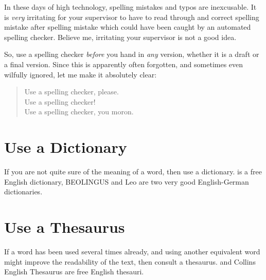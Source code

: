 In these days of high technology, spelling mistakes and typos are
inexcusable. It is \emph{very} irritating for your supervisor to have
to read through and correct spelling mistake after spelling mistake
which could have been caught by an automated spelling checker.
Believe me, irritating your supervisor is not a good idea.

So, use a spelling checker \emph{before} you hand in \emph{any}
version, whether it is a draft or a final version.
Since this is apparently often forgotten, and sometimes even wilfully
ignored, let me make it absolutely clear:
\begin{quote}
\begin{em}
Use a spelling checker, please. \\
Use a spelling checker! \\
Use a spelling checker, you moron. \\
\end{em}
\end{quote}





\section{Use a Dictionary}
\label{sec:dictionary}

If you are not quite sure of the meaning of a word, then use a
dictionary.  \parencite{DictionaryCom} is a
free English dictionary, BEOLINGUS \parencite{DictChemnitz} and Leo
\parencite{DictLeoOrg} are two very good English-German dictionaries.




\section{Use a Thesaurus}
\label{sec:thesaurus}

If a word has been used several times already, and using another
equivalent word might improve the readability of the text, then
consult a thesaurus.  \parencite{ThesaurusCom}
and Collins English Thesaurus \parencite{CollinsThesaurus} are free
English thesauri.



